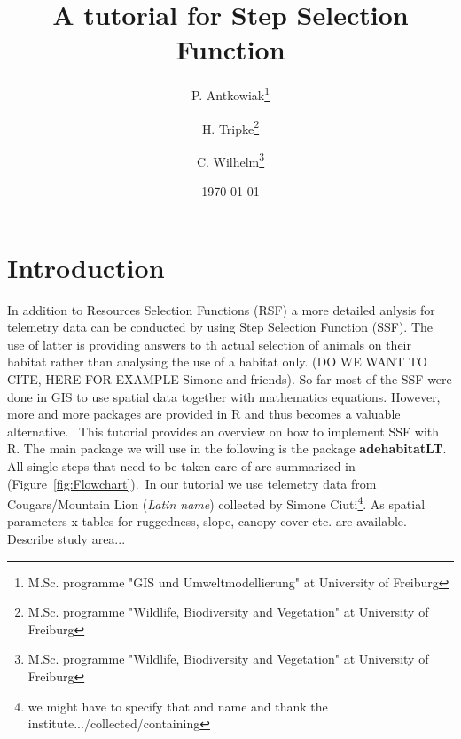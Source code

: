 \documentclass[11pt, a4paper]{article}\usepackage[]{graphicx}\usepackage[]{color}
\begin{document}



\title{A tutorial for Step Selection Function}

\author{P. Antkowiak\thanks{M.Sc. programme "GIS und Umweltmodellierung" at University of Freiburg} \and H. Tripke\thanks{M.Sc. programme "Wildlife, Biodiversity and Vegetation" at University of Freiburg} \and C. Wilhelm\thanks{M.Sc. programme "Wildlife, Biodiversity and Vegetation" at University of Freiburg}}

\date{\today} %

\maketitle


\tableofcontents

\newpage

\section{Introduction}%
In addition to Resources Selection Functions (RSF) a more detailed anlysis for telemetry data can be conducted by using Step Selection Function (SSF). The use of latter is providing answers to th actual selection of animals on their habitat rather than analysing the use of a habitat only. (DO WE WANT TO CITE, HERE FOR EXAMPLE Simone and friends). So far most of the SSF were done in GIS to use spatial data together with mathematics equations. However, more and more packages are provided in R and thus becomes a valuable alternative. \
This tutorial provides an overview on how to implement SSF with R. The main package we will use in the following is the package \textbf{adehabitatLT}. All single steps that need to be taken care of are summarized in (Figure~\ref{fig:Flowchart}).\
In our tutorial we use telemetry data from Cougars/Mountain Lion (\textit{Latin name}) collected by Simone Ciuti\footnote{we might have to specify that and name and thank the institute.../collected/containing}. As spatial parameters x tables for ruggedness, slope, canopy cover etc. are available. Describe study area...\
\end{document}
